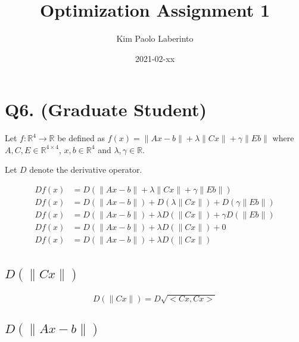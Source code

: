 \documentclass{article}
\title{Optimization Assignment 1}
\date{2021-02-xx}
\author{Kim Paolo Laberinto}
\begin{document}
    \maketitle
    \newpage

    \section{Q6. (Graduate Student)}

    Let $f: \mathbb{R}^4 \rightarrow \mathbb{R}$ be defined as $f(x) = \| Ax - b \| + \lambda \| Cx \| + \gamma \| Eb \|$ where $A, C, E \in \mathbb{R}^{4 \times 4}$, $x,b \in \mathbb{R}^4$ and $\lambda,\gamma \in \mathbb{R}$.

    Let $D$ denote the derivative operator.

    \begin{align*}
    Df(x) &= D \left( \| Ax - b \| + \lambda \| Cx \| + \gamma \| Eb \| \right) \\
    Df(x) &= D \left( \| Ax - b \| \right) +  D \left(\lambda \| Cx \| \right) +  D \left(\gamma \| Eb \| \right) \\
    Df(x) &= D \left( \| Ax - b \| \right) +  \lambda D \left( \| Cx \| \right) +  \gamma D \left( \| Eb \| \right) \\
    Df(x) &= D \left( \| Ax - b \| \right) +  \lambda D \left( \| Cx \| \right) +  0 \\
    Df(x) &= D \left( \| Ax - b \| \right) +  \lambda D \left( \| Cx \| \right) \\
    \end{align*}

    \subsection{ $D \left(\| Cx \| \right)$ }

    \begin{align*}
        D\left( \| Cx \| \right) = D \sqrt{<Cx, Cx>}
    \end{align*}

    \subsection{ $D \left( \| Ax-b \| \right)$ }
\end{document}
